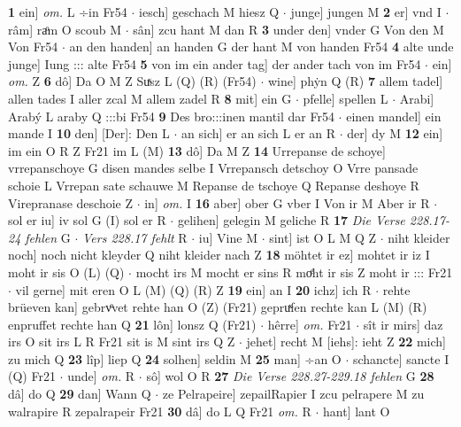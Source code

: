 \documentclass[8pt,a4paper,notitlepage]{article}
\begin{document}
\begin{table}[ht]
\begin{minipage}[t]{0.5\linewidth}
\textbf{1} ein] \textit{om.} L ÷in Fr54  $\cdot$ iesch] geschach M hiesz Q  $\cdot$ junge] jungen M \textbf{2} er] vnd I  $\cdot$ râm] raͦm O scoub M  $\cdot$ sân] zcu hant M dan R \textbf{3} under den] vnder G Von den M Von Fr54  $\cdot$ an den handen] an handen G der hant M von handen Fr54 \textbf{4} alte unde junge] Iung ::: alte Fr54 \textbf{5} von im ein ander tag] der ander tach von im Fr54  $\cdot$ ein] \textit{om.} Z \textbf{6} dô] Da O M Z Suͯsz L (Q) (R) (Fr54)  $\cdot$ wine] phẏn Q (R) \textbf{7} allem tadel] allen tades I aller zcal M allem zadel R \textbf{8} mit] ein G  $\cdot$ pfelle] spellen L  $\cdot$ Arabi] Arabý L araby Q :::bi Fr54 \textbf{9} Des bro:::inen mantil dar Fr54  $\cdot$ einen mandel] ein mande I \textbf{10} den] [Der]: Den L  $\cdot$ an sich] er an sich L er an R  $\cdot$ der] dy M \textbf{12} ein] im ein O R Z Fr21 im L (M) \textbf{13} dô] Da M Z \textbf{14} Urrepanse de schoye] vrrepanschoye G disen mandes selbe I Vrrepansch detschoy O Vrre pansade schoie L Vrrepan sate schauwe M Repanse de tschoye Q Repanse deshoye R Virepranase deschoie Z  $\cdot$ in] \textit{om.} I \textbf{16} aber] ober G vber I Von ir M Aber ir R  $\cdot$ sol er iu] iv sol G (I) sol er R  $\cdot$ gelihen] gelegin M geliche R \textbf{17} \textit{Die Verse 228.17-24 fehlen} G   $\cdot$ \textit{Vers 228.17 fehlt} R   $\cdot$ iu] Vine M  $\cdot$ sint] ist O L M Q Z  $\cdot$ niht kleider noch] noch nicht kleyder Q niht kleider nach Z \textbf{18} möhtet ir ez] mohtet ir iz I moht ir sis O (L) (Q)  $\cdot$ mocht irs M mocht er sins R moͤht ir sis Z moht ir ::: Fr21  $\cdot$ vil gerne] mit eren O L (M) (Q) (R) Z \textbf{19} ein] an I \textbf{20} ichz] ich R  $\cdot$ rehte brüeven kan] gebrvͦvet rehte han O (Z) (Fr21) gepruͯfen rechte kan L (M) (R) enpruffet rechte han Q \textbf{21} lôn] lonsz Q (Fr21)  $\cdot$ hêrre] \textit{om.} Fr21  $\cdot$ sît ir mirs] daz irs O sit irs L R Fr21 sit is M sint irs Q Z  $\cdot$ jehet] recht M [iehs]: ieht Z \textbf{22} mich] zu mich Q \textbf{23} lîp] liep Q \textbf{24} solhen] seldin M \textbf{25} man] ÷an O  $\cdot$ schancte] sancte I (Q) Fr21  $\cdot$ unde] \textit{om.} R  $\cdot$ sô] wol O R \textbf{27} \textit{Die Verse 228.27-229.18 fehlen} G  \textbf{28} dâ] do Q \textbf{29} dan] Wann Q  $\cdot$ ze Pelrapeire] zepailRapier I zcu pelrapere M zu walrapire R zepalrapeir Fr21 \textbf{30} dâ] do L Q Fr21 \textit{om.} R  $\cdot$ hant] lant O \newline
\end{minipage}
\hspace{0.5cm}
\begin{minipage}[t]{0.5\linewidth}

\end{minipage}
\end{table}
\end{document}
